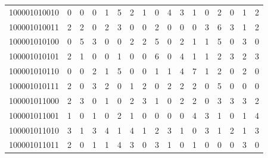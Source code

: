 \documentclass[10pt,a4paper]{article}
\begin{document}
\begin{longtable}{ |c|c|c|c|c|c|c|c|c|c|c|c|c|c|c|c|c| }
    100001010010              & 0                            & 0                                & 0                            & 1                              & 5   & 2   & 1   & 0   & 4   & 3   & 1   & 0   & 2   & 0   & 1   & 2   \\
    100001010011              & 2                            & 2                                & 0                            & 2                              & 3   & 0   & 0   & 2   & 0   & 0   & 0   & 3   & 6   & 3   & 1   & 2   \\
    100001010100              & 0                            & 5                                & 3                            & 0                              & 0   & 2   & 2   & 5   & 0   & 2   & 1   & 1   & 5   & 0   & 3   & 0   \\
    100001010101              & 2                            & 1                                & 0                            & 0                              & 1   & 0   & 0   & 6   & 0   & 4   & 1   & 1   & 2   & 3   & 2   & 3   \\
    100001010110              & 0                            & 0                                & 2                            & 1                              & 5   & 0   & 0   & 1   & 1   & 4   & 7   & 1   & 2   & 0   & 2   & 0   \\
    100001010111              & 2                            & 0                                & 3                            & 2                              & 0   & 1   & 2   & 0   & 2   & 2   & 2   & 0   & 5   & 0   & 0   & 0   \\
    100001011000              & 2                            & 3                                & 0                            & 1                              & 0   & 2   & 3   & 1   & 0   & 2   & 2   & 0   & 3   & 3   & 3   & 2   \\
    100001011001              & 1                            & 0                                & 1                            & 0                              & 2   & 1   & 0   & 0   & 0   & 0   & 4   & 3   & 1   & 0   & 1   & 4   \\
    100001011010              & 3                            & 1                                & 3                            & 4                              & 1   & 4   & 1   & 2   & 3   & 1   & 0   & 3   & 1   & 2   & 1   & 3   \\
    100001011011              & 2                            & 0                                & 1                            & 1                              & 4   & 3   & 0   & 3   & 1   & 0   & 1   & 0   & 0   & 0   & 3   & 0   \\

\end{longtable}
\end{document}
